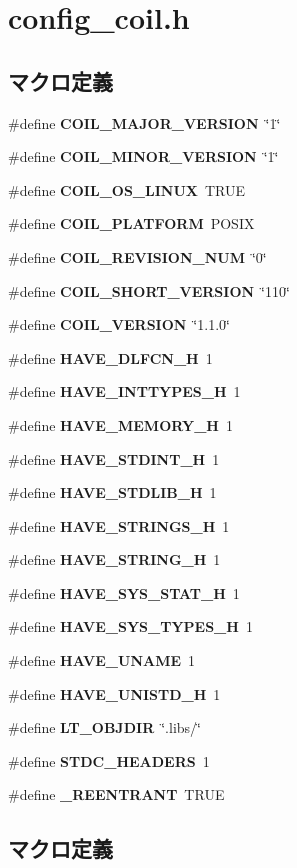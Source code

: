 \section{config\_\-coil.h}
\label{config__coil_8h}
\subsection*{マクロ定義}
\begin{DoxyCompactItemize}
\item 
\#define {\bf COIL\_\-MAJOR\_\-VERSION}~\char`\"{}1\char`\"{}
\item 
\#define {\bf COIL\_\-MINOR\_\-VERSION}~\char`\"{}1\char`\"{}
\item 
\#define {\bf COIL\_\-OS\_\-LINUX}~TRUE
\item 
\#define {\bf COIL\_\-PLATFORM}~POSIX
\item 
\#define {\bf COIL\_\-REVISION\_\-NUM}~\char`\"{}0\char`\"{}
\item 
\#define {\bf COIL\_\-SHORT\_\-VERSION}~\char`\"{}110\char`\"{}
\item 
\#define {\bf COIL\_\-VERSION}~\char`\"{}1.1.0\char`\"{}
\item 
\#define {\bf HAVE\_\-DLFCN\_\-H}~1
\item 
\#define {\bf HAVE\_\-INTTYPES\_\-H}~1
\item 
\#define {\bf HAVE\_\-MEMORY\_\-H}~1
\item 
\#define {\bf HAVE\_\-STDINT\_\-H}~1
\item 
\#define {\bf HAVE\_\-STDLIB\_\-H}~1
\item 
\#define {\bf HAVE\_\-STRINGS\_\-H}~1
\item 
\#define {\bf HAVE\_\-STRING\_\-H}~1
\item 
\#define {\bf HAVE\_\-SYS\_\-STAT\_\-H}~1
\item 
\#define {\bf HAVE\_\-SYS\_\-TYPES\_\-H}~1
\item 
\#define {\bf HAVE\_\-UNAME}~1
\item 
\#define {\bf HAVE\_\-UNISTD\_\-H}~1
\item 
\#define {\bf LT\_\-OBJDIR}~\char`\"{}.libs/\char`\"{}
\item 
\#define {\bf STDC\_\-HEADERS}~1
\item 
\#define {\bf \_\-REENTRANT}~TRUE
\end{DoxyCompactItemize}


\subsection{マクロ定義}
